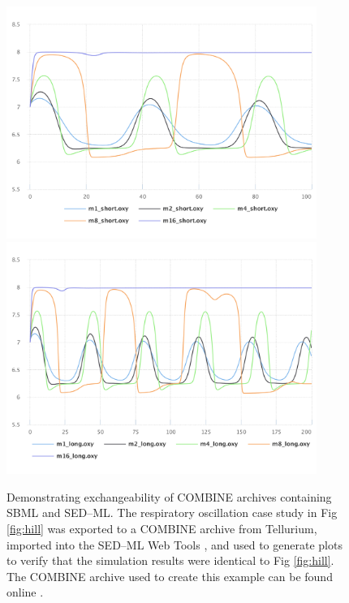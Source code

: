 \documentclass[10pt,letterpaper]{article}
\begin{document}
\begin{figure}
  \includegraphics[width=0.9\textwidth]{swt-fig1.pdf}
  \includegraphics[width=0.9\textwidth]{swt-fig2.pdf}
  \caption{Demonstrating exchangeability of COMBINE archives containing SBML and SED--ML. The respiratory oscillation case study in Fig \ref{fig:hill} was exported to a COMBINE archive from Tellurium, imported into the SED--ML Web Tools \cite{bergmann2017sed}, and used to generate plots to verify that the simulation results were identical to Fig \ref{fig:hill}. The COMBINE archive used to create this example can be found online \cite{wolfhillstudy}. }
  \label{fig:swt}
\end{figure}
\end{document}
